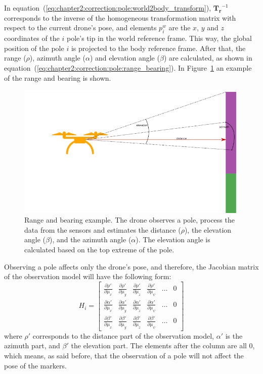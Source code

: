 In equation~(\ref{eq:chapter2:correction:pole:world2body_transform}), $\bm{T_r}^{-1}$ corresponds to the inverse of the homogeneous transformation matrix with respect to the current drone's pose, and elements $p_i^w$ are the $x$, $y$ and $z$ coordinates of the $i$ pole's tip in the world reference frame. This way, the global position of the pole $i$ is projected to the body reference frame. After that, the range ($\rho$), azimuth angle ($\alpha$) and elevation angle ($\beta$) are calculated, as shown in equation~(\ref{eq:chapter2:correction:pole:range_bearing}). In Figure~\ref{fig:chapter2:correction:poles:range_bearing} an example of the range and bearing is shown.
\begin{figure}[h]
    \centering
    \includegraphics[width=\textwidth]{Figures/fig7-range_and_bearing}
    \caption[Range and Bearing example]{Range and bearing example. The drone observes a pole, process the data from the sensors and estimates the distance ($\rho$), the elevation angle ($\beta$), and the azimuth angle ($\alpha$). The elevation angle is calculated based on the top extreme of the pole.}
    \label{fig:chapter2:correction:poles:range_bearing}
\end{figure}

Observing a pole affects only the drone's pose, and therefore, the Jacobian matrix of the observation model will have the following form:
\begin{equation}
    H_i = \begin{bmatrix}
        \frac{\partial \rho'}{\partial \mu_x} & \frac{\partial \rho'}{\partial \mu_y} & \frac{\partial \rho'}{\partial \mu_z} & \frac{\partial \rho'}{\partial \mu_{\psi}} & \dots & 0 \\
        \frac{\partial \alpha'}{\partial \mu_x} & \frac{\partial \alpha'}{\partial \mu_y} & \frac{\partial \alpha'}{\partial \mu_z} & \frac{\partial \alpha'}{\partial \mu_{\psi}} & \dots & 0 \\
        \frac{\partial \beta'}{\partial \mu_x} & \frac{\partial \beta'}{\partial \mu_y} & \frac{\partial \beta'}{\partial \mu_z} & \frac{\partial \beta'}{\partial \mu_{\psi}} & \dots & 0
    \end{bmatrix}
\end{equation}
where $\rho'$ corresponds to the distance part of the observation model, $\alpha'$ is the azimuth part, and $ \beta'$ the elevation part. The elements after the  column are all 0, which means, as said before, that the observation of a pole will not affect the pose of the markers.

